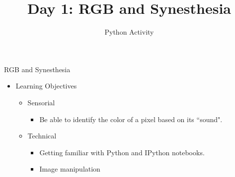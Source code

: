 \documentclass{beamer}
\title[{\color{blue}{Day 1}}]{{Day 1: RGB and Synesthesia}}
\author{Python Activity}
\date{}
\begin{document}
\begin{frame}
   \titlepage
\end{frame}



\begin{frame}{RGB and Synesthesia}
   \begin{itemize}
      \item Learning Objectives
      \begin{itemize}
         \item Sensorial
         \begin{itemize}
            \item Be able to identify the color of a pixel based on its ``sound".
         \end{itemize}
         \item Technical
         \begin{itemize}
            \item Getting familiar with Python and IPython notebooks.
            \item Image manipulation
         \end{itemize}
      \end{itemize}
   \end{itemize}
\end{frame}
\end{document}
